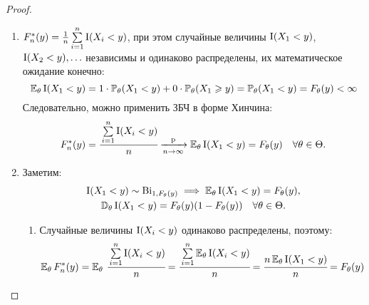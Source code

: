 \begin{proof}\leavevmode
    \begin{enumerate}
        \item 
            $F_{n}^{*}(y)=\frac{1}{n} \sum\limits_{i=1}^{n} \Ind(X_{i}<y)$, при этом случайные величины $\Ind(X_{1}<y)$, $\Ind(X_{2}<y), \ldots$ независимы и одинаково распределены, их математическое ожидание конечно:
            \begin{equation*}
                \ExpTh \Ind(X_{1}<y)=1 \cdot \MyPrTh (X_{1}<y)+0 \cdot \MyPrTh (X_{1} \geqslant y) = \MyPrTh (X_{1}<y)=F_{\theta}(y) < \infty
            \end{equation*}
            Следовательно, можно применить ЗБЧ в форме Хинчина:
            \begin{equation*}
                F_{n}^{*}(y)=\cfrac{\sum\limits_{i=1}^{n} \Ind(X_{i}<y)}{n} \xrightarrow[n \to \infty]{\text{p}} \ExpTh \Ind(X_{1}<y)=F_{\theta}(y) \quad \AllTh.
            \end{equation*}
        \item 
            Заметим:
            \begin{gather*}
                \Ind(X_{1}<y) \sim  \Binom_{1, F_{\theta}(y)} \implies \ExpTh \Ind(X_{1}<y) = F_{\theta}(y), \\
                \VarTh \Ind(X_{1}<y) = F_{\theta}(y)(1-F_{\theta}(y)) \quad \AllTh.
            \end{gather*}
            \begin{enumerate}[label={\arabic*)}]
                \item Случайные величины $\Ind(X_{i}<y)$ одинаково распределены, поэтому:
                \begin{equation*}
                    \ExpTh F_{n}^{*}(y) = \ExpTh \, \cfrac{\sum\limits_{i=1}^{n} \Ind(X_{i}<y)}{n} =\cfrac{\sum\limits_{i=1}^{n} \ExpTh \Ind(X_{i}<y)}{n}=\cfrac{n \ExpTh \Ind(X_{1}<y)}{n}=F_{\theta}(y)  
                \end{equation*}
                

\end{enumerate}
\end{enumerate}
\end{proof}
